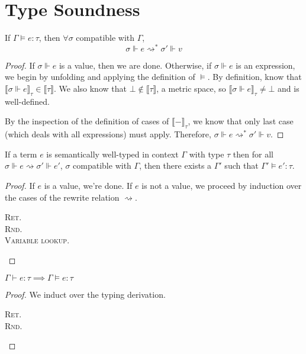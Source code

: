\section{Type Soundness}
\begin{lemma}[Termination]
  If $\Gamma \vDash e : \tau$, then $\forall \sigma$ compatible with $\Gamma$, 
  $$\sigma \Vdash e \rightsquigarrow^* \sigma' \Vdash v$$
\end{lemma}
\begin{proof}
  If $\sigma \Vdash e$ is a value, then we are done. Otherwise, if $\sigma
  \Vdash e$ is an expression, we begin by unfolding and applying the definition
  of $\vDash$. By definition, know that $\llbracket \sigma \Vdash e \rrbracket_{\tau} \in
  \llbracket \tau \rrbracket$. We also know that $\bot \not\in \llbracket \tau
  \rrbracket$, a metric space, so $\llbracket \sigma \Vdash e \rrbracket_{\tau}
  \not= \bot$ and is well-defined.

  By the inspection of the definition of cases of $\llbracket -
  \rrbracket_{\tau}$, we know that only last case (which deals with all
  expressions) must apply. Therefore, $\sigma \Vdash e \rightsquigarrow^*
  \sigma' \Vdash v$.
\end{proof}

\begin{theorem}
If a term $e$ is semantically well-typed in context $\Gamma$ with type $\tau$
  then for all $\sigma \Vdash e \rightsquigarrow \sigma' \Vdash e'$, $\sigma$
  compatible with $\Gamma$, then there exists a $\Gamma'$ such that $\Gamma'
  \vDash e' : \tau$.
\end{theorem}
\begin{proof}
If $e$ is a value, we're done. 
If $e$ is not a value, we proceed by induction over the cases of the rewrite relation
$\rightsquigarrow$.
\begin{description}
  \item[\textsc{Ret.}]
  \item[\textsc{Rnd.}]
  \item[\textsc{Variable lookup.}]
\end{description}
\end{proof}

\begin{theorem}
$\Gamma \vdash e : \tau \implies \Gamma \vDash e : \tau$
\end{theorem}
\begin{proof}
We induct over the typing derivation.
\begin{description}
  \item[\textsc{Ret.}]
  \item[\textsc{Rnd.}]
\end{description}
\end{proof}

